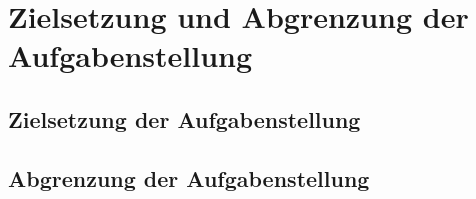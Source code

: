 \section{Zielsetzung und Abgrenzung der Aufgabenstellung}
\label{sec:aufgabenstellung}

\subsection{Zielsetzung der Aufgabenstellung}

\subsection{Abgrenzung der Aufgabenstellung}